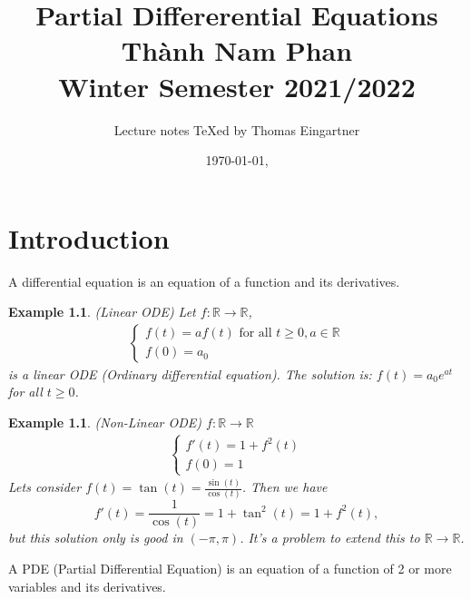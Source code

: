 \documentclass{report}
\title{Partial Differerential Equations \\ Thành Nam Phan \\ Winter Semester 2021/2022}
\author{Lecture notes \TeX{}ed by Thomas Eingartner}
\date{\today, \currenttime}
\theoremstyle{tommy}
\newtheorem{eg}[defn]{Example}
\begin{document}
\maketitle
\tableofcontents
\newpage



\chapter{Introduction}

A differential equation is an equation of a function and its derivatives. 

\begin{eg} (Linear ODE)
  Let \(f: \mathbb{R} \to \mathbb{R}\),
  \begin{align*}
    \begin{cases}
      f(t) = a f(t) \text{ for all } t \ge 0, a \in \mathbb{R} \\
      f(0) = a_0
    \end{cases}
  \end{align*}
  is a linear ODE (Ordinary differential equation). The solution is: \(f(t) = a_0 e^{at}\) for all \(t \ge 0\).
\end{eg}

\begin{eg} (Non-Linear ODE) \(f: \mathbb{R} \to \mathbb{R}\)
  \begin{align*}
    \begin{cases}
      f'(t) = 1 + f^2(t) \\
      f(0) = 1
    \end{cases}
  \end{align*}
  Lets consider \(f(t) = \tan(t) = \frac{\sin(t)}{\cos(t)}\). Then we have \[f'(t) = \frac{1}{\cos(t)} = 1 + \tan^2(t) = 1 + f^2(t),\] but this solution only is \emph{good} in \((- \pi, \pi)\). It's a problem to extend this to \(\mathbb{R} \to \mathbb{R}\).
\end{eg}

A PDE (Partial Differential Equation) is an equation of a function of 2 or more variables and its derivatives.
\end{document}
